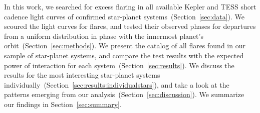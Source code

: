 \documentclass[twocolumn]{aastex631}
\begin{document}
In this work, we searched for excess flaring in all available Kepler and TESS short cadence light curves of confirmed star-planet systems~(Section~\ref{sec:data}). We scoured the light curves for flares, and tested their observed phases for departures from a uniform distribution in phase with the innermost planet's orbit~(Section~\ref{sec:methods}). We present the catalog of all flares found in our sample of star-planet systems, and compare the test results with the expected power of interaction for each system~(Section~\ref{sec:results}). We discuss the results for the most interesting star-planet systems individually~(Section~\ref{sec:results:individualstars}), and take a look at the patterns emerging from our analysis~(Section~\ref{sec:discussion}). We summarize our findings in Section~\ref{sec:summary}. 








\end{document}
